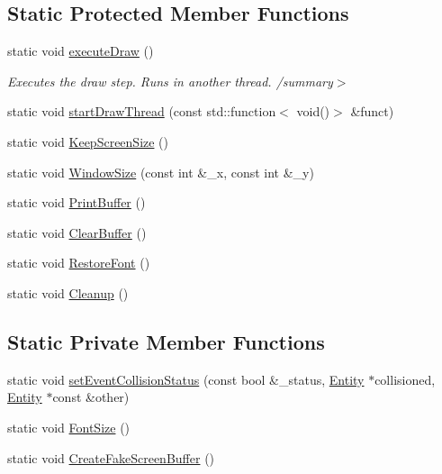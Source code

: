 \subsection*{Static Protected Member Functions}
\begin{DoxyCompactItemize}
\item 
static void \hyperlink{classrl_util_j_m_ad9dc4f7945ef3b7619b792b8d82f3580}{execute\+Draw} ()
\begin{DoxyCompactList}\small\item\em Executes the draw step. Runs in another thread. /summary$>$ \end{DoxyCompactList}\item 
static void \hyperlink{classrl_util_j_m_a367f3a8c8eaed42854a775dd8be511a4}{start\+Draw\+Thread} (const std\+::function$<$ void()$>$ \&funct)
\item 
static void \hyperlink{classrl_util_j_m_a42a91e1b4843f6326c79e7dcd3701d3e}{Keep\+Screen\+Size} ()
\item 
static void \hyperlink{classrl_util_j_m_a6816ea9d8b393b20bbac3b2712d20654}{Window\+Size} (const int \&\+\_\+x, const int \&\+\_\+y)
\item 
static void \hyperlink{classrl_util_j_m_addc07d316aedfb7a7aa13bd774a7ad06}{Print\+Buffer} ()
\item 
static void \hyperlink{classrl_util_j_m_aa7d02be670eaf0a8ac3d97a71f85cd8c}{Clear\+Buffer} ()
\item 
static void \hyperlink{classrl_util_j_m_adc81711e284db4c813ec7055eab05ad7}{Restore\+Font} ()
\item 
static void \hyperlink{classrl_util_j_m_a6981baa969d95022e67aeeff1d38deda}{Cleanup} ()
\end{DoxyCompactItemize}
\subsection*{Static Private Member Functions}
\begin{DoxyCompactItemize}
\item 
static void \hyperlink{classrl_util_j_m_a1f75535f3200ef421bb28afd77358627}{set\+Event\+Collision\+Status} (const bool \&\+\_\+status, \hyperlink{class_entity}{Entity} $\ast$collisioned, \hyperlink{class_entity}{Entity} $\ast$const \&other)
\item 
static void \hyperlink{classrl_util_j_m_a22d403c1bad6a4b6eb74bba4f200496d}{Font\+Size} ()
\item 
static void \hyperlink{classrl_util_j_m_a89821abf41757212f1a4f046b734d45b}{Create\+Fake\+Screen\+Buffer} ()
\end{DoxyCompactItemize}
